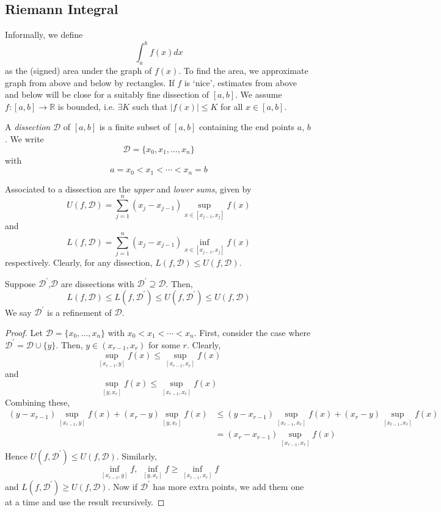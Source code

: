 \documentclass[10pt, a4paper, twoside]{report}
\begin{document}
\subsection{Riemann Integral}
Informally, we define 
    \[\int_a^bf(x)dx\]
    as the (signed) area under the graph of \(f(x)\).
To find the area, we approximate graph from above and below by rectangles. If \(f\) is `nice', estimates from above and below will be close for a suitably fine dissection of \([a,b]\). We assume \(f:[a,b]\to\mathbb{R}\) is bounded, i.e. \(\exists K\) such that \(|f(x)|\leq K\) for all \(x\in[a,b]\).
\begin{definition}
    A \emph{dissection} \(\mathcal{D}\) of \([a,b]\) is a finite subset of \([a,b]\) containing the end points \(a\), \(b\). We write 
    \[\mathcal{D}=\{x_0,x_1,\ldots,x_n\}\]
    with 
    \[a=x_0<x_1<\cdots<x_n=b\]
\end{definition}
Associated to a dissection are the \emph{upper} and \emph{lower sums}, given by 
\[U(f,\mathcal{D})=\sum_{j=1}^{n}(x_j-x_{j-1})\sup_{x\in[x_{j-1},x_j]}f(x)\]
and 
\[L(f,\mathcal{D})=\sum_{j=1}^{n}(x_j-x_{j-1})\inf_{x\in[x_{j-1},x_j]}f(x)\]
respectively. Clearly, for any dissection, \(L(f,\mathcal{D})\leq U(f,\mathcal{D})\).
\begin{lemma}
    Suppose \(\mathcal{D}^\prime\),\(\mathcal{D}\) are dissections with \(\mathcal{D}^\prime\supseteq\mathcal{D}\). Then,
    \[L(f,\mathcal{D})\leq L(f,\mathcal{D}^\prime)\leq U(f,\mathcal{D}^\prime)\leq U(f,\mathcal{D})\]
    We say \(\mathcal{D}^\prime\) is a refinement of \(\mathcal{D}\).
    \label{lemma:refine}
\end{lemma}
\begin{proof}
    Let \(\mathcal{D}=\{x_0,\ldots,x_n\}\) with \(x_0<x_1<\cdots<x_n\). First, consider the case where \(\mathcal{D}^\prime=\mathcal{D}\cup\{y\}\). Then, \(y\in(x_{r-1},x_r)\) for some \(r\). Clearly,
    \[\sup_{[x_{r-1},y]}f(x)\leq\sup_{[x_{r-1},x_r]}f(x)\]
    and 
    \[\sup_{[y,x_r]}f(x)\leq\sup_{[x_{r-1},x_r]}f(x)\]
    Combining these,
    \begin{align*}
        (y-x_{r-1})\sup_{[x_{r-1},y]}f(x)+(x_r-y)\sup_{[y,x_r]}f(x)&\leq (y-x_{r-1})\sup_{[x_{r-1},x_r]}f(x)+(x_r-y)\sup_{[x_{r-1},x_r]}f(x) \\
        &=(x_r-x_{r-1})\sup_{[x_{r-1},x_r]}f(x)
    \end{align*}
    Hence \(U(f,\mathcal{D}^\prime)\leq U(f,\mathcal{D})\). Similarly, 
    \[\inf_{[x_{r-1},y]}f,\;\inf_{[y,x_r]}f\geq\inf_{[x_{r-1},x_r]}f\]
    and \(L(f,\mathcal{D}^\prime)\geq U(f,\mathcal{D})\). Now if \(\mathcal{D}^\prime\) has more extra points, we add them one at a time and use the result recursively.
\end{proof}
\end{document}
